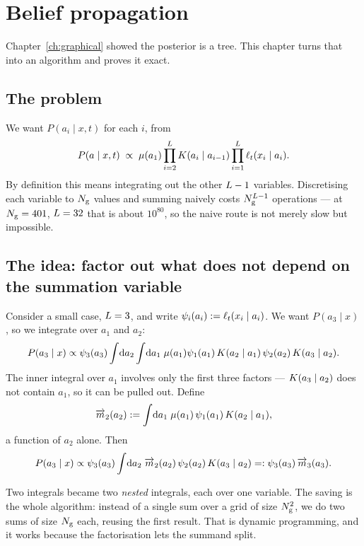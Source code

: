 \chapter{Belief propagation}
\label{ch:bp}

Chapter~\ref{ch:graphical} showed the posterior is a tree. This chapter turns that into an
algorithm and proves it exact.

\section{The problem}

We want $P(a_i\mid x,t)$ for each $i$, from
\begin{equation}
P(a\mid x,t) \;\propto\; \mu(a_1)\prod_{i=2}^{L}K(a_i\mid a_{i-1})
\prod_{i=1}^{L}\ell_t(x_i\mid a_i).
\end{equation}
By definition this means integrating out the other $L-1$ variables. Discretising each
variable to $N_{\mathrm{g}}$ values and summing naively costs $N_{\mathrm{g}}^{L-1}$ operations --- at
$N_{\mathrm{g}}=401$, $L=32$ that is about $10^{80}$, so the naive route is not merely slow but
impossible.

\section{The idea: factor out what does not depend on the summation variable}

Consider a small case, $L=3$, and write $\psi_i(a_i) := \ell_t(x_i\mid a_i)$. We want
$P(a_3\mid x)$, so we integrate over $a_1$ and $a_2$:
\[
P(a_3\mid x) \propto \psi_3(a_3)\int\!\mathrm{d}a_2 \int\!\mathrm{d}a_1\;
\mu(a_1)\psi_1(a_1)\,K(a_2\mid a_1)\,\psi_2(a_2)\,K(a_3\mid a_2).
\]
The inner integral over $a_1$ involves only the first three factors --- $K(a_3\mid a_2)$
does not contain $a_1$, so it can be pulled out. Define
\[
\overrightarrow{m}_2(a_2) := \int\!\mathrm{d}a_1\; \mu(a_1)\,\psi_1(a_1)\,K(a_2\mid a_1),
\]
a function of $a_2$ alone. Then
\[
P(a_3\mid x) \propto \psi_3(a_3)\int\!\mathrm{d}a_2\;\overrightarrow{m}_2(a_2)\,\psi_2(a_2)\,K(a_3\mid a_2)
=: \psi_3(a_3)\,\overrightarrow{m}_3(a_3).
\]

\begin{intuition}
Two integrals became two \emph{nested} integrals, each over one variable. The saving is the
whole algorithm: instead of a single sum over a grid of size $N_{\mathrm{g}}^{2}$, we do two sums of
size $N_{\mathrm{g}}$ each, reusing the first result. That is dynamic programming, and it works
because the factorisation lets the summand split.
\end{intuition}

